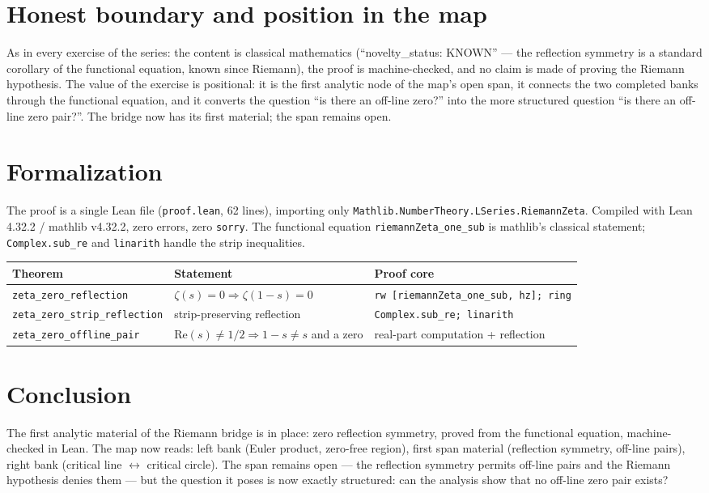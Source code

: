 \documentclass[sigplan,10pt,anonymous,review]{acmart}
\begin{document}
\section{Honest boundary and position in the map}

As in every exercise of the series: the content is classical mathematics
(``novelty\_status: KNOWN'' --- the reflection symmetry is a standard
corollary of the functional equation, known since Riemann), the proof is
machine-checked, and no claim is made of proving the Riemann hypothesis.
The value of the exercise is positional: it is the first analytic node of
the map's open span, it connects the two completed banks through the
functional equation, and it converts the question ``is there an off-line
zero?'' into the more structured question ``is there an off-line zero
pair?''. The bridge now has its first material; the span remains open.

\section{Formalization}

The proof is a single Lean file (\texttt{proof.lean}, 62 lines),
importing only \texttt{Mathlib.NumberTheory.LSeries.RiemannZeta}.
Compiled with Lean 4.32.2 / mathlib v4.32.2, zero errors, zero
\texttt{sorry}. The functional equation
\texttt{riemannZeta\_one\_sub} is mathlib's classical statement;
\texttt{Complex.sub\_re} and \texttt{linarith} handle the strip
inequalities.

\begin{center}
\begin{tabular}{lll}
\toprule
Theorem & Statement & Proof core \\
\midrule
\texttt{zeta\_zero\_reflection} & $\zeta(s)=0 \Rightarrow \zeta(1-s)=0$
  & \texttt{rw [riemannZeta\_one\_sub, hz]; ring} \\
\texttt{zeta\_zero\_strip\_reflection} & strip-preserving reflection
  & \texttt{Complex.sub\_re; linarith} \\
\texttt{zeta\_zero\_offline\_pair} & $\mathrm{Re}(s) \ne 1/2 \Rightarrow 1-s \ne s$ and a zero
  & real-part computation + reflection \\
\bottomrule
\end{tabular}
\end{center}

\section{Conclusion}

The first analytic material of the Riemann bridge is in place: zero
reflection symmetry, proved from the functional equation, machine-checked
in Lean. The map now reads: left bank (Euler product, zero-free region),
first span material (reflection symmetry, off-line pairs), right bank
(critical line $\leftrightarrow$ critical circle). The span remains open
--- the reflection symmetry permits off-line pairs and the Riemann
hypothesis denies them --- but the question it poses is now exactly
structured: can the analysis show that no off-line zero pair exists?



\end{document}
